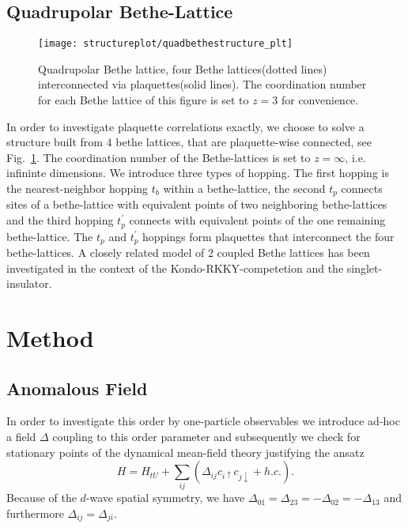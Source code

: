 \documentclass[aps,prb,twocolumn,groupedaddress,amsmath,amssymb]{revtex4-1}
\newcommand{\up}{\uparrow}
\newcommand{\dn}{\downarrow}
\newcommand{\reffig}[1]{Fig.~\ref{#1}}
\begin{document}
\subsection{Quadrupolar Bethe-Lattice}
\begin{figure}[th]
  \texttt{[image: structureplot/quadbethestructure\_plt]}
  \caption{Quadrupolar Bethe lattice, four Bethe lattices(dotted lines) interconnected via plaquettes(solid lines). The coordination number for each Bethe lattice of this figure is set to $z=3$ for convenience.}
  \label{fig:structure}
\end{figure}
In order to investigate plaquette correlations exactly, we choose to solve a structure built from 4 bethe lattices, that are plaquette-wise connected, see \reffig{fig:structure}. The coordination number of the Bethe-lattices is set to $z=\infty$, i.e. infininte dimensions. We introduce three types of hopping. The first hopping is the nearest-neighbor hopping $t_b$ within a bethe-lattice, the second $t_p$ connects sites of a bethe-lattice with equivalent points of two neighboring bethe-lattices and the third hopping $t^\prime_p$ connects with equivalent points of the one remaining bethe-lattice. The $t_p$ and $t^\prime_p$ hoppings form plaquettes that interconnect the four bethe-lattices. A closely related model of 2 coupled Bethe lattices has been investigated in the context of the Kondo-RKKY-competetion\cite{Moeller1999} and the singlet-insulator\cite{Hafermann2009}.

\section{Method}
\subsection{Anomalous Field}
In order to investigate this order by one-particle observables we introduce ad-hoc a field $\Delta$ coupling to this order parameter and subsequently we check for stationary points of the dynamical mean-field theory justifying the ansatz
\begin{equation}
  \label{eq:hamiltonian}
  H = H_{tU}+\sum_{ij}(\Delta_{ij} c_{i\up} c_{j\dn} + h.c.).
\end{equation}
Because of the $d$-wave spatial symmetry, we have $\Delta_{01}=\Delta_{23} =-\Delta_{02} =-\Delta_{13}$ and furthermore $\Delta_{ij} = \Delta_{ji}$.
\end{document}
